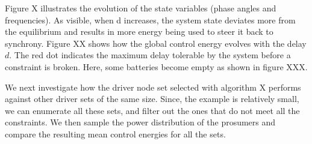 \documentclass[10pt,twoside%
                ,draft%
        ]{article}
\begin{document}
Figure X illustrates the evolution of the state variables (phase angles and frequencies).
As visible, when d increases, the system state deviates more from the equilibrium and results in more energy being used to steer it back to synchrony. Figure XX shows how the global control energy evolves with the delay $ d$. The red dot indicates the maximum delay tolerable by the system before a constraint is broken. Here, some batteries become empty as shown in figure XXX. 

We next investigate how the driver node set selected with algorithm X performs against other driver sets of the same size. Since, the example is relatively small, we can enumerate all these sets, and filter out the ones that do not meet all the constraints. We then sample the power distribution of the prosumers and compare the resulting mean  control energies for all the sets.




\end{document}
